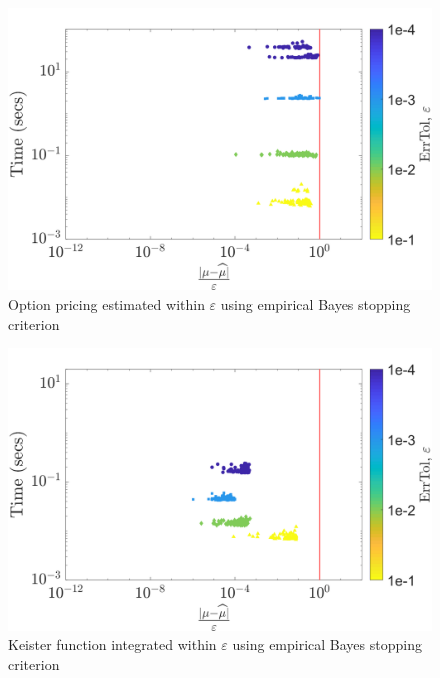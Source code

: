 \documentclass[twocolumn]{svjour3}          %
\begin{document}
\begin{figure}
	\centering
	\includegraphics[width=0.95\linewidth]{"figures/optPrice_guaranteed_time_MLE_Baker_29-Jul-2018 03-10-33"}
	\caption[Guaranteed:]{Option pricing estimated within $\varepsilon$ using empirical Bayes stopping criterion}
	\label{fig:optprice-guaranteed-MLE}
\end{figure}
\begin{figure}
	\centering
	\includegraphics[width=0.95\linewidth]{"figures/Keister_guaranteed_time_MLE_C2sin_29-Jul-2018 02-13-57"}
	\caption[Guaranteed:]{Keister function integrated within $\varepsilon$ using empirical Bayes stopping criterion}
	\label{fig:keister-guaranteed-MLE}
\end{figure}
\end{document}
